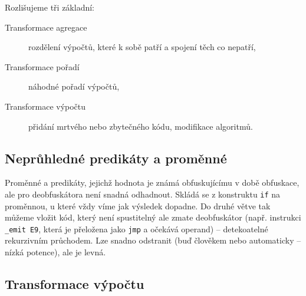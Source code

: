 Rozlišujeme tři základní:

\begin{description}
    \item[Transformace agregace] rozdělení výpočtů, které k sobě patří a spojení těch co nepatří,
    \item[Transformace pořadí] náhodné pořadí výpočtů,
    \item[Transformace výpočtu] přidání mrtvého nebo zbytečného kódu, modifikace algoritmů. 
\end{description}

\subsection*{Neprůhledné predikáty a proměnné}

Proměnné a predikáty, jejichž hodnota je známá obfuskujícímu v době obfuskace, ale pro deobfuskátora není snadná odhadnout.
Skládá se z konstruktu \texttt{if} na proměnnou, u které vždy víme jak výsledek dopadne.
Do druhé větve tak můžeme vložit kód, který není spustitelný ale zmate deobfuskátor (např. instrukci \texttt{\_emit E9}, která je přeložena jako \texttt{jmp} a očekává operand) -- detekoatelné rekurzivním průchodem.
Lze snadno odstranit (buď člověkem nebo automaticky -- nízká potence), ale je levná.

\subsection*{Transformace výpočtu}

